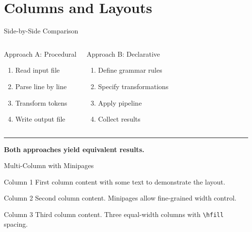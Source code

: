 \documentclass[
  doctype=beamer,
  beameraspectratio=169,
  beamertheme=Madrid,
  institution=generic,
]{omnilatex}
\begin{document}
\section{Columns and Layouts}

\begin{frame}{Side-by-Side Comparison}
  \begin{columns}[T]
    \begin{block}{Approach A: Procedural}
      \begin{enumerate}
        \item Read input file
        \item Parse line by line
        \item Transform tokens
        \item Write output file
      \end{enumerate}
    \end{block}

    \begin{block}{Approach B: Declarative}
      \begin{enumerate}
        \item Define grammar rules
        \item Specify transformations
        \item Apply pipeline
        \item Collect results
      \end{enumerate}
    \end{block}
  \end{columns}

  \vspace{1em}
  \rule{1\textwidth}{0.4pt}

  \begin{center}
    \textbf{\color{OmniPrimaryColor}Both approaches yield equivalent results.}
  \end{center}
\end{frame}

\begin{frame}{Multi-Column with Minipages}
  \begin{minipage}{0.3\textwidth}
    \begin{block}{Column 1}
      First column content with some text to demonstrate the layout.
    \end{block}
  \end{minipage}\hfill
  \begin{minipage}{0.3\textwidth}
    \begin{block}{Column 2}
      Second column content. Minipages allow fine-grained width control.
    \end{block}
  \end{minipage}\hfill
  \begin{minipage}{0.3\textwidth}
    \begin{block}{Column 3}
      Third column content. Three equal-width columns with \texttt{\textbackslash hfill} spacing.
    \end{block}
  \end{minipage}
\end{frame}
\end{document}
